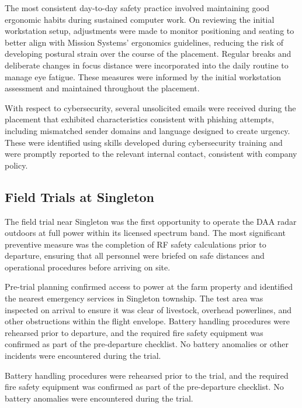 The most consistent day-to-day safety practice involved maintaining good ergonomic habits
during sustained computer work. On reviewing the initial workstation setup, adjustments were
made to monitor positioning and seating to better align with Mission Systems' ergonomics
guidelines, reducing the risk of developing postural strain over the course of the placement.
Regular breaks and deliberate changes in focus distance were incorporated into the daily
routine to manage eye fatigue. These measures were informed by the initial workstation
assessment and maintained throughout the placement.
 
With respect to cybersecurity, several unsolicited emails were received during the placement
that exhibited characteristics consistent with phishing attempts, including mismatched sender
domains and language designed to create urgency. These were identified using skills developed
during cybersecurity training and were promptly reported to the relevant internal contact,
consistent with company policy.
 
\subsection*{Field Trials at Singleton}
 
The field trial near Singleton was the first opportunity to operate the DAA radar
outdoors at full power within its licensed spectrum band. The most significant preventive
measure was the completion of RF safety calculations prior to departure, ensuring that all
personnel were briefed on safe distances and operational procedures before arriving on site.
 
Pre-trial planning confirmed access to power at the farm property and identified the nearest
emergency services in Singleton township. The test area was inspected on arrival to ensure
it was clear of livestock, overhead powerlines, and other obstructions within the flight
envelope. Battery handling procedures were rehearsed prior to departure, and the required
fire safety equipment was confirmed as part of the pre-departure checklist. No battery
anomalies or other incidents were encountered during the trial.
 
Battery handling procedures were rehearsed prior to the trial, and the required fire safety
equipment was confirmed as part of the pre-departure checklist. No battery anomalies were
encountered during the trial.
 
